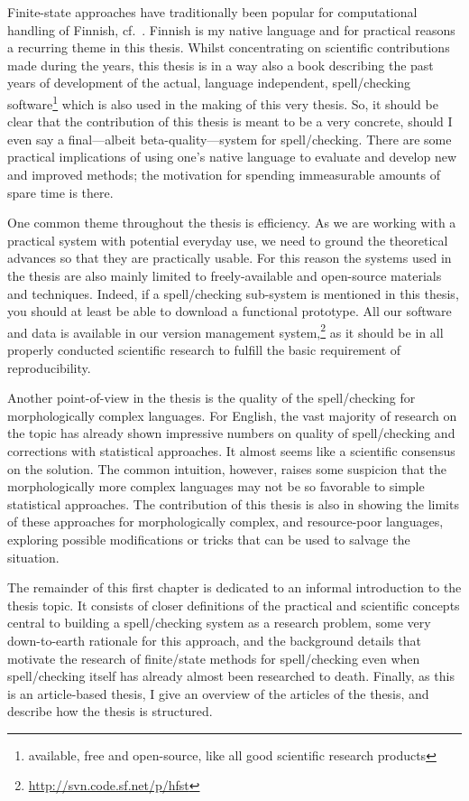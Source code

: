 \documentclass[officiallayout]{unihelcompling}
\begin{document}
Finite-state approaches have traditionally been popular for computational
handling of Finnish, cf.~\citet{koskenniemi1983twolevel}. Finnish is my native
language and for practical reasons a recurring theme in this thesis. Whilst
concentrating on scientific contributions made during the years, this thesis is
in a way also a book describing the past years of development of the actual,
language independent, spell\-/checking software\footnote{available, free and
open-source, like all good scientific research products} which is also used in
the making of this very thesis. So, it should be clear that the contribution of
this thesis is meant to be a very concrete, should I even say a final---albeit
beta-quality---system for spell\-/checking.  There are some practical
implications of using one's native language to evaluate and develop new and
improved methods; the motivation for spending immeasurable amounts of spare
time is there.

One common theme throughout the thesis is efficiency. As we are working with a
practical system with potential everyday use, we need to ground the theoretical
advances so that they are practically usable. For this reason the systems used
in the thesis are also mainly limited to freely-available and open-source
materials and techniques. Indeed, if a spell\-/checking sub-system is mentioned
in this thesis, you should at least be able to download a functional prototype.
All our software and data is available in our version management
system,\footnote{\url{http://svn.code.sf.net/p/hfst}} as it should be in all
properly conducted scientific research to fulfill the basic requirement of
reproducibility.

Another point-of-view in the thesis is the quality of the spell\-/checking for
morphologically complex languages. For English, the vast majority of
research on the topic has already shown impressive numbers on quality of
spell\-/checking and corrections with statistical approaches. It almost seems
like a scientific consensus on the solution. The common intuition,
however, raises some suspicion that the morphologically more complex languages
may not be so favorable to simple statistical approaches. The contribution of
this thesis is also in showing the limits of these approaches for
morphologically complex, and resource-poor languages, exploring possible
modifications or tricks that can be used to salvage the situation.

The remainder of this first chapter is dedicated to an informal introduction to
the thesis topic. It consists of closer definitions of the practical and
scientific concepts central to building a spell\-/checking system as a research
problem, some very down-to-earth rationale for this approach, and the
background details that motivate the research of finite\-/state methods for
spell\-/checking even when spell\-/checking itself has already almost been
researched to death. Finally, as this is an article-based thesis, I give an
overview of the articles of the thesis, and describe how the thesis is
structured.
\end{document}
